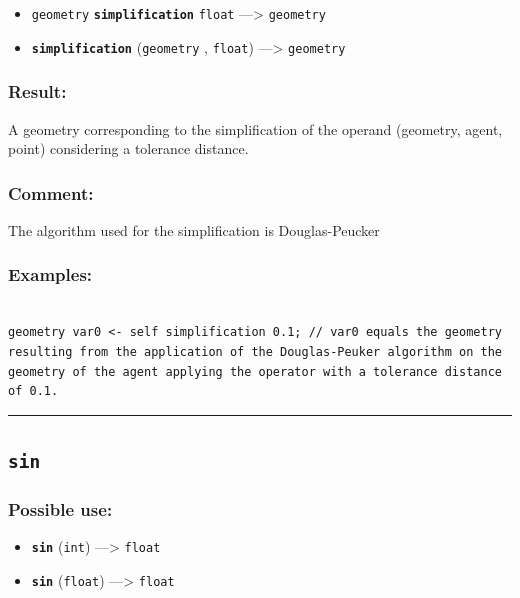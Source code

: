 \documentclass[]{book}
\providecommand{\tightlist}{%
  \setlength{\itemsep}{0pt}\setlength{\parskip}{0pt}}
\theoremstyle{definition}
\theoremstyle{definition}
\theoremstyle{definition}
\theoremstyle{remark}
\begin{document}
\begin{itemize}
\tightlist
\item
  \texttt{geometry} \textbf{\texttt{simplification}} \texttt{float}
  ---\textgreater{} \texttt{geometry}
\item
  \textbf{\texttt{simplification}} (\texttt{geometry} , \texttt{float})
  ---\textgreater{} \texttt{geometry}
\end{itemize}

\subsubsection{Result:}\label{result-459}

A geometry corresponding to the simplification of the operand (geometry,
agent, point) considering a tolerance distance.

\subsubsection{Comment:}\label{comment-88}

The algorithm used for the simplification is Douglas-Peucker

\subsubsection{Examples:}\label{examples-331}

\begin{verbatim}
 
geometry var0 <- self simplification 0.1; // var0 equals the geometry resulting from the application of the Douglas-Peuker algorithm on the geometry of the agent applying the operator with a tolerance distance of 0.1.
\end{verbatim}

\begin{center}\rule{0.5\linewidth}{\linethickness}\end{center}

\subsection{\texorpdfstring{\texttt{sin}}{sin}}\label{sin}

\subsubsection{Possible use:}\label{possible-use-476}

\begin{itemize}
\tightlist
\item
  \textbf{\texttt{sin}} (\texttt{int}) ---\textgreater{} \texttt{float}
\item
  \textbf{\texttt{sin}} (\texttt{float}) ---\textgreater{}
  \texttt{float}
\end{itemize}
\end{document}
